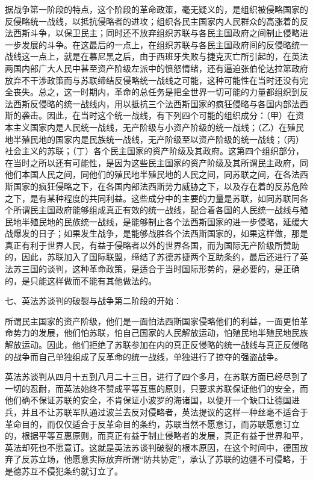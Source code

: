 据战争第一阶段的特点，这个阶段的革命政策，毫无疑义的，是组织被侵略国家的反侵略统一战线，以抵抗侵略者的进攻；组织各民主国家内人民群众的高涨着的反法西斯斗争，以保卫民主；同时还不放弃组织苏联与各民主国政府之间制止侵略进一步发展的斗争。在这最后的一点上，在组织苏联与各民主国政府间的反侵略统一战线这一点上，就是在慕尼黑之后，由于西班牙失败与捷克灭亡所引起的，在英法两国内部广大人民中甚至资产阶级左派中的愤怒情绪，还有逼迫张伯伦达拉第政府放弃不干涉政策而与苏联缔结反侵略统一战线之可能，这种可能性在当时还没有完全丧失。总之，这一时期内，革命的总任务是把全世界一切可能的力量都组织到反法西斯反侵略的统一战线内，用以抵抗三个法西斯国家的疯狂侵略与各国内部法西斯的袭击。因此，在当时这个统一战线，有下列四个可能的组织成分：（甲）在资本主义国家内是人民统一战线，无产阶级与小资产阶级的统一战线；（乙）在殖民地半殖民地的国家内是民族统一战线，无产阶级至以资产阶级的统一战线；（丙）社会主义的苏联；（丁）各个民主国家的资产阶级及其政府。这第四个组织部分，在当时之所以还有可能性，是因为这些民主国家的资产阶级及其所谓民主政府，同他们本国人民之间，同他们的殖民地半殖民地的人民之间，同苏联之间，在各法西斯国家的疯狂侵略之下，在各国内部法西斯势力威胁之下，以及存在着的反苏危险之下，是有某种程度的共同利益。这些成分中的主要的力量是苏联，如同苏联同各个所谓民主国政府能够组成真正有效的统一战线，配合着各国的人民统一战线与殖民地半殖民地的民族统一战线，是能够制止各个法西斯国家的进一步侵略，延缓大战爆发的日子；如果发生战争，是能够战胜各个法西斯国家的，如果这样做，那是真正有利于世界人民，有益于侵略者以外的世界各国，而为国际无产阶级所赞助的，因此，苏联加入了国际联盟，缔结了苏德苏捷两个互助条约，最后还进行了英法苏三国的谈判，这种革命政策，是适合于当时国际形势的，是必要的，是正确的，是只能这样做而不能有其他做法的。

七、英法苏谈判的破裂与战争第二阶段的开始：

所谓民主国家的资产阶级，他们是一面怕法西斯国家侵略他们的利益，一面更怕革命势力的发展，他们怕苏联，怕自己国家的人民解放运动，怕殖民地半殖民地民族解放运动。因此，他们拒绝了苏联参加在内的真正反侵略的统一战线与真正反侵略的战争而自己单独组成了反革命的统一战线，单独进行了掠夺的强盗战争。

英法苏谈判从四月十五到八月二十三日，进行了四个多月，在苏联方面已经尽到了一切的忍耐，而英法始终不赞成平等互惠的原则，只要求苏联保证他们的安全，而他们确不保证苏联的安全，不肯保证小波罗的海诸国，以便开一个缺口让德国进兵，并且不让苏联军队通过波兰去反对侵略者，英法提议的这样一种丝毫不适合于革命目的，而仅仅适合于反革命目的条约，苏联当然不愿意订，而苏联愿意订立的，根据平等互惠原则，而真正有益于制止侵略者的发展，真正有益于世界和平，英法却死也不愿意订。这就是英法苏谈判破裂的根本原因，在这个时间中，德国放弃了反苏立场，他愿意实际放弃所谓“防共协定”，承认了苏联的边疆不可侵略，于是德苏互不侵犯条约就订立了。


